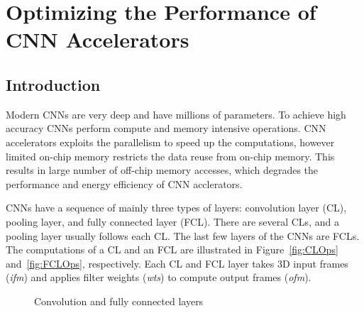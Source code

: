 \documentclass[a4paper,10pt]{article}
\begin{document}
\section{Optimizing the Performance of CNN Accelerators}
\subsection{Introduction}
Modern CNNs are very deep and have millions of parameters. To achieve high accuracy CNNs perform compute and memory intensive operations.  CNN accelerators exploits the parallelism to speed up the computations, however limited on-chip memory restricts the data reuse from on-chip memory. This results in large number of off-chip memory accesses, which degrades the performance and energy efficiency of CNN acclerators. 

CNNs have a sequence of mainly three types of layers: convolution layer (CL), pooling layer, and fully connected layer (FCL). There are several CLs, and a pooling layer usually follows each CL. The last few layers of the CNNs are FCLs. The computations of a CL and an FCL are illustrated in Figure~\ref{fig:CLOps} and~\ref{fig:FCLOps}, respectively. Each CL and FCL layer takes 3D input frames (\textit{ifm}) and applies filter weights (\textit{wts}) to compute output frames (\textit{ofm}).
\begin{figure}[!htb]
	\centering
	\hfil	
	\hfil	
	\caption{Convolution and fully connected layers}
	\label{fig:CNNAcceleratorAndCLOps}
	\vspace{-1.0em}	
\end{figure}
\end{document}
